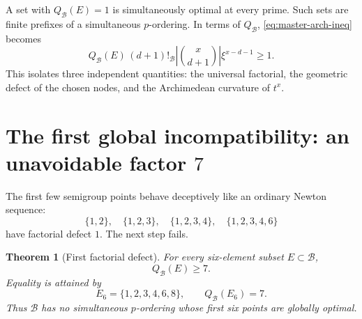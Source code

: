 \documentclass[11pt,oneside]{article}
\newtheorem{theorem}{Theorem}[section]
\theoremstyle{definition}
\theoremstyle{remark}
\newcommand{\B}{\mathcal B}
\begin{document}
A set with \(Q_{\B}(E)=1\) is simultaneously optimal at every prime.  Such sets are finite
prefixes of a simultaneous \(p\)-ordering.  In terms of \(Q_{\B}\),
\eqref{eq:master-arch-ineq} becomes
\begin{equation}
 Q_{\B}(E)\,(d+1)!_{\B}
 \left|\binom{x}{d+1}\right|\xi^{x-d-1}\ge1.
 \label{eq:master-Q}
\end{equation}
This isolates three independent quantities: the universal factorial, the geometric defect of
the chosen nodes, and the Archimedean curvature of \(t^x\).

\section{The first global incompatibility: an unavoidable factor \(7\)}
\label{sec:first-defect}

The first few semigroup points behave deceptively like an ordinary Newton sequence:
\[
 \{1,2\},\quad
 \{1,2,3\},\quad
 \{1,2,3,4\},\quad
 \{1,2,3,4,6\}
\]
have factorial defect \(1\).  The next step fails.

\begin{theorem}[First factorial defect]
\label{thm:first-defect}
For every six-element subset \(E\subset\B\),
\begin{equation}
  Q_{\B}(E)\ge7.
  \label{eq:first-defect-lower}
\end{equation}
Equality is attained by
\begin{equation}
  E_6=\{1,2,3,4,6,8\},
  \qquad
  Q_{\B}(E_6)=7.
  \label{eq:first-defect-equality}
\end{equation}
Thus \(\B\) has no simultaneous \(p\)-ordering whose first six points are globally optimal.
\end{theorem}
\end{document}
